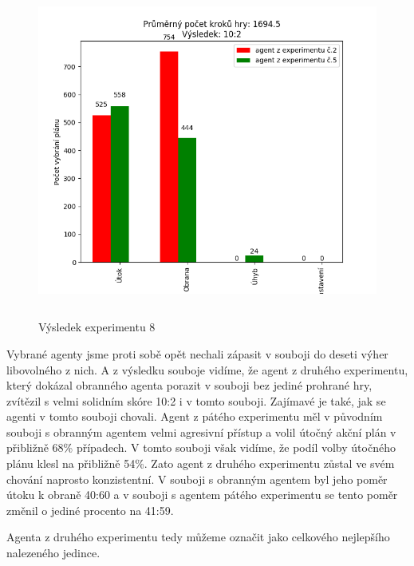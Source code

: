 \begin{figure}[H]\centering
\includegraphics[width=145mm, height=110mm]{./Obrazky/Experiment08Results.png}
\caption{Výsledek experimentu 8}
\label{Výsledek experimentu 08}
\end{figure}

Vybrané agenty jsme proti sobě opět nechali zápasit v souboji do deseti výher libovolného z nich.
A z výsledku souboje vidíme, že agent z druhého experimentu, který dokázal obranného agenta porazit v souboji bez jediné prohrané hry, zvítězil s velmi solidním skóre 10:2 i v tomto souboji.
Zajímavé je také, jak se agenti v tomto souboji chovali.
Agent z pátého experimentu měl v původním souboji s obranným agentem velmi agresivní přístup a volil útočný akční plán v přibližně 68\% případech.
V tomto souboji však vidíme, že podíl volby útočného plánu klesl na přibližně 54\%.
Zato agent z druhého experimentu zůstal ve svém chování naprosto konzistentní. V souboji s obranným agentem byl jeho poměr útoku k obraně 40:60 a v souboji s agentem pátého experimentu se tento poměr změnil o jediné procento na 41:59.
\par
Agenta z druhého experimentu tedy můžeme označit jako celkového nejlepšího nalezeného jedince.